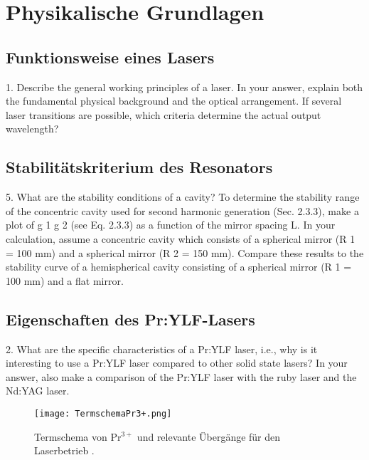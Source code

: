 \section{Physikalische Grundlagen}

\subsection{Funktionsweise eines Lasers}

1. Describe the general working principles of a laser. In your answer, explain both the fundamental
physical background and the optical arrangement. If several laser transitions are possible, which
criteria determine the actual output wavelength?

\subsection{Stabilitätskriterium des Resonators}

5. What are the stability conditions of a cavity? To determine the stability range of the concentric
cavity used for second harmonic generation (Sec. 2.3.3), make a plot of g 1 g 2 (see Eq. 2.3.3) as a
function of the mirror spacing L. In your calculation, assume a concentric cavity which consists of
a spherical mirror (R 1 = 100 mm) and a spherical mirror (R 2 = 150 mm). Compare these results
to the stability curve of a hemispherical cavity consisting of a spherical mirror (R 1 = 100 mm) and
a flat mirror.



\subsection{Eigenschaften des Pr:YLF-Lasers}

2. What are the specific characteristics of a Pr:YLF laser, i.e., why is it interesting to use a Pr:YLF
laser compared to other solid state lasers? In your answer, also make a comparison of the Pr:YLF
laser with the ruby laser and the Nd:YAG laser.

\begin{figure}[H]
\begin{center}
  \texttt{[image: TermschemaPr3+.png]}
  \caption{Termschema von Pr$^{3+}$ und relevante Übergänge für den Laserbetrieb
  \cite{Versuchsanleitung}.}
  \label{img:Termschema}
\end{center}
\end{figure}

